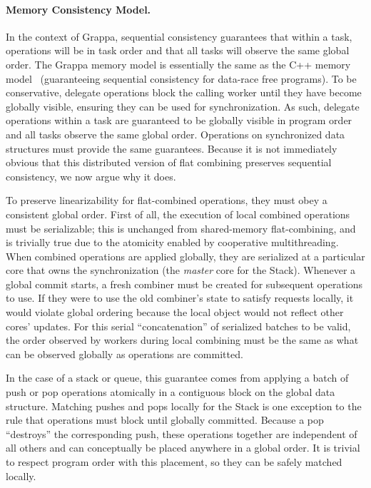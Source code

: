 \paragraph{Memory Consistency Model.}
\label{sec:memory-model}
In the context of Grappa, sequential consistency guarantees that within a
task, operations will be in task order and that all tasks will observe the
same global order.
The Grappa memory model is essentially the same as the C++ memory
model~\cite{boehm:drf0,N2480,N2800} (guaranteeing sequential
consistency for data-race free programs). To be conservative, delegate
operations block the calling worker until they have become globally visible,
ensuring they can be used for synchronization. As such, delegate operations
within a task are guaranteed to be globally visible in program order and all
tasks observe the same global order.
Operations on synchronized data structures must provide the same guarantees.
Because it is not immediately obvious
that this distributed version of flat combining preserves sequential
consistency, we now argue why it does.

To preserve linearizability for flat-combined operations, they must obey a consistent global order.
First of all, the execution of local combined operations must be serializable;
this is unchanged from shared-memory flat-combining, and is trivially true due to the atomicity enabled by cooperative multithreading.
When combined operations are applied globally, they are serialized at a particular core that owns the synchronization (the \emph{master} core for the Stack).
Whenever a global commit starts, a fresh combiner must be created for subsequent operations to use. If they were to use the old combiner's state to satisfy requests locally, it would violate global ordering because the local object would not reflect other cores' updates.
For this serial ``concatenation'' of serialized batches to be valid, the order observed by workers during local combining must be the same as what can be observed globally as operations are committed.

In the case of a stack or queue, this guarantee comes from applying a batch of push or pop operations atomically in a contiguous block on the global data structure.
Matching pushes and pops locally for the Stack is one exception to the rule that operations must block until globally committed. Because a pop ``destroys'' the corresponding push, these operations together are independent of all others and can conceptually be placed anywhere in a global order. It is trivial to respect program order with this placement, so they can be safely matched locally.

